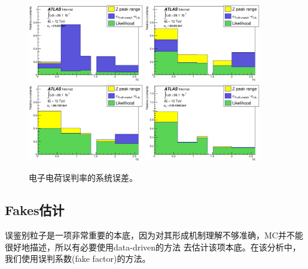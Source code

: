 \begin{figure}[h]
\centering
  \includegraphics[width=0.45\textwidth]{fig/QmisID/Syst1_tight.eps}
  \includegraphics[width=0.45\textwidth]{fig/QmisID/Syst2_tight.eps}
  \includegraphics[width=0.45\textwidth]{fig/QmisID/Syst3_tight.eps}
  \includegraphics[width=0.45\textwidth]{fig/QmisID/Syst4_tight.eps}
  \caption{电子电荷误判率的系统误差。}
\label{fig:QmisID_syst}
\end{figure}
\clearpage
\subsection{Fakes估计}
误鉴别粒子是一项非常重要的本底，因为对其形成机制理解不够准确，MC并不能很好地描述，所以有必要使用data-driven的方法
去估计该项本底。在该分析中，我们使用误判系数(fake factor)的方法。

